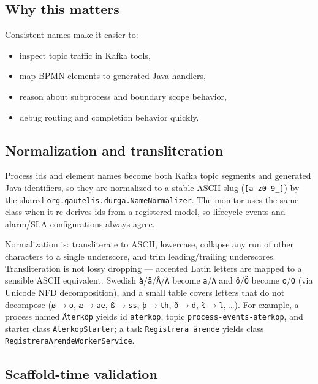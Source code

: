 \subsection{Why this matters}

Consistent names make it easier to:
\begin{itemize}
\item inspect topic traffic in Kafka tools,
\item map BPMN elements to generated Java handlers,
\item reason about subprocess and boundary scope behavior,
\item debug routing and completion behavior quickly.
\end{itemize}

\subsection{Normalization and transliteration}
\label{sec:NameNormalization}

Process ids and element names become both Kafka topic segments and generated Java
identifiers, so they are normalized to a stable ASCII slug (\texttt{[a-z0-9\_]}) by
the shared \texttt{org.gautelis.durga.NameNormalizer}. The monitor uses the same
class when it re-derives ids from a registered model, so lifecycle events and
alarm/SLA configurations always agree.

Normalization is: transliterate to ASCII, lowercase, collapse any run of other
characters to a single underscore, and trim leading/trailing underscores.
Transliteration is not lossy dropping --- accented Latin letters are mapped to a
sensible ASCII equivalent. Swedish \texttt{å}/\texttt{ä}/\texttt{Å}/\texttt{Ä}
become \texttt{a}/\texttt{A} and \texttt{ö}/\texttt{Ö} become \texttt{o}/\texttt{O}
(via Unicode NFD decomposition), and a small table covers letters that do not
decompose (\texttt{ø}$\to$\texttt{o}, \texttt{æ}$\to$\texttt{ae},
\texttt{ß}$\to$\texttt{ss}, \texttt{þ}$\to$\texttt{th}, \texttt{ð}$\to$\texttt{d},
\texttt{ł}$\to$\texttt{l}, \dots). For example, a process named
\texttt{\"Aterk\"op} yields id \texttt{aterkop}, topic
\texttt{process-events-aterkop}, and starter class \texttt{AterkopStarter}; a task
\texttt{Registrera \"arende} yields class \texttt{RegistreraArendeWorkerService}.

\subsection{Scaffold-time validation}


